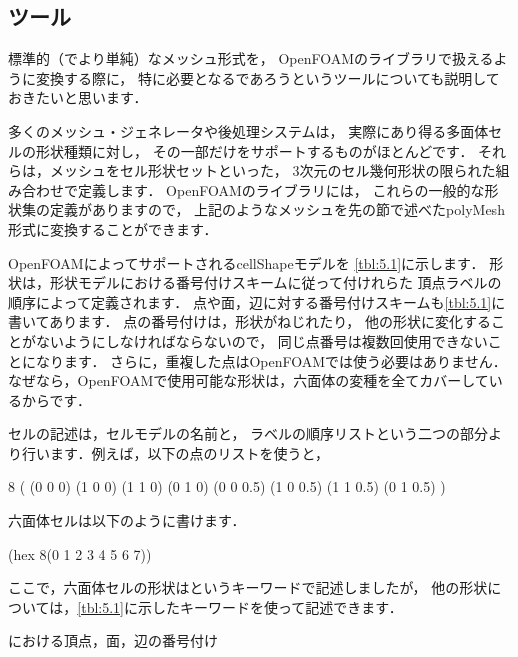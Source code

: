 \subsection{ツール}
\label{ssec:5.1.3}
標準的（でより単純）なメッシュ形式を，
OpenFOAMのライブラリで扱えるように変換する際に，
特に必要となるであろうというツールについても説明しておきたいと思います．

多くのメッシュ・ジェネレータや後処理システムは，
実際にあり得る多面体セルの形状種類に対し，
その一部だけをサポートするものがほとんどです．
それらは，メッシュをセル形状セットといった，
3次元のセル幾何形状の限られた組み合わせで定義します．
OpenFOAMのライブラリには，
これらの一般的な形状集の定義がありますので，
上記のようなメッシュを先の節で述べたpolyMesh形式に変換することができます．

OpenFOAMによってサポートされるcellShapeモデルを
\autoref{tbl:5.1}に示します．
形状は，形状モデルにおける番号付けスキームに従って付けれらた
頂点ラベルの順序によって定義されます．
点や面，辺に対する番号付けスキームも\autoref{tbl:5.1}に書いてあります．
点の番号付けは，形状がねじれたり，
他の形状に変化することがないようにしなければならないので，
同じ点番号は複数回使用できないことになります．
さらに，重複した点はOpenFOAMでは使う必要はありません．
なぜなら，OpenFOAMで使用可能な形状は，六面体の変種を全てカバーしているからです．

セルの記述は，セルモデルの名前と，
ラベルの順序リストという二つの部分より行います．例えば，以下の点のリストを使うと，
\begin{OFverbatim}[file]
8
    (
        (0 0 0)
        (1 0 0)
        (1 1 0)
        (0 1 0)
        (0 0 0.5)
        (1 0 0.5)
        (1 1 0.5)
        (0 1 0.5)
    )
\end{OFverbatim}
六面体セルは以下のように書けます．
\begin{OFverbatim}[file]
(hex 8(0 1 2 3 4 5 6 7))
\end{OFverbatim}
ここで，六面体セルの形状はというキーワードで記述しましたが，
他の形状については，\autoref{tbl:5.1}に示したキーワードを使って記述できます．


\begin{table}[p]
 
 \caption{における頂点，面，辺の番号付け}
 \label{tbl:5.1}
\end{table}


